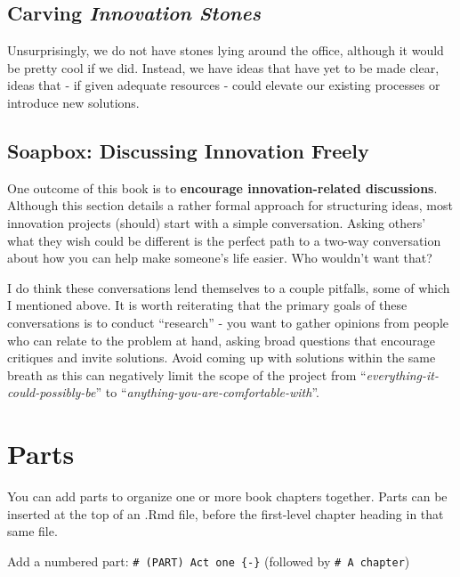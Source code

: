 \documentclass[
]{book}
\theoremstyle{definition}
\theoremstyle{definition}
\theoremstyle{definition}
\theoremstyle{definition}
\theoremstyle{remark}
\begin{document}
\hypertarget{carving-innovation-stones}{%
\section{\texorpdfstring{Carving \emph{Innovation Stones}}{Carving Innovation Stones}}\label{carving-innovation-stones}}

Unsurprisingly, we do not have stones lying around the office, although it would
be pretty cool if we did. Instead, we have ideas that have yet to be made
clear, ideas that - if given adequate resources - could elevate our existing
processes or introduce new solutions.

\hypertarget{soapbox-discussing-innovation-freely}{%
\section{Soapbox: Discussing Innovation Freely}\label{soapbox-discussing-innovation-freely}}

One outcome of this book is to \textbf{encourage innovation-related discussions}.
Although this section details a rather formal approach for structuring ideas,
most innovation projects (should) start with a simple conversation. Asking
others' what they wish could be different is the perfect path to a two-way
conversation about how you can help make someone's life easier. Who wouldn't
want that?

I do think these conversations lend themselves to a couple pitfalls, some of
which I mentioned above. It is worth reiterating that the primary goals of
these conversations is to conduct ``research'' - you want to gather opinions
from people who can relate to the problem at hand, asking broad questions
that encourage critiques and invite solutions. Avoid coming up with solutions
within the same breath as this can negatively limit the scope of the project
from ``\emph{everything-it-could-possibly-be}'' to
``\emph{anything-you-are-comfortable-with}''.

\hypertarget{parts}{%
\chapter{Parts}\label{parts}}

You can add parts to organize one or more book chapters together. Parts can be inserted at the top of an .Rmd file, before the first-level chapter heading in that same file.

Add a numbered part: \texttt{\#\ (PART)\ Act\ one\ \{-\}} (followed by \texttt{\#\ A\ chapter})
\end{document}
